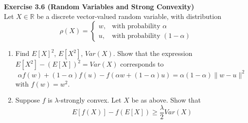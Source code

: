 \documentclass[
10pt, %
a4paper, %
oneside, %
headinclude,footinclude, %
BCOR5mm, %
]{scrartcl}
\newenvironment{problem}[2][]
               { \begin{mdframed}[backgroundcolor=gray!20] \textbf{#1 #2} \\}
               {  \end{mdframed}}
\begin{document}
\begin{problem}{Exercise 3.6 (Random Variables and Strong Convexity)}
  Let $X \in \mathbb{R}$ be a discrete vector-valued random variable, with distribution
  \[
  \rho(X) =
  \begin{cases}
    w, & \text{with probability }\alpha \\
    u, & \text{with probability }(1 - \alpha)
  \end{cases}
  \]
  \begin{enumerate}
      \item Find $E[X]^2$, $E[X^2]$, $Var(X)$. Show that the expression $E[X^2] - (E[X])^2 = Var(X)$ corresponds to
      \[
      \alpha f(w) + (1 - \alpha) f(u) - f(\alpha w + (1 - \alpha) u) = \alpha (1 - \alpha) \|w - u\|^2
      \]
      with $f(w) = w^2$.

      \item Suppose $f$ is $\lambda$-strongly convex. Let $X$ be as above. Show that
      \[
      E[f(X)] - f(E[X]) \geq \frac{\lambda}{2} Var(X)
      \]
  \end{enumerate}
\end{problem}
\end{document}
